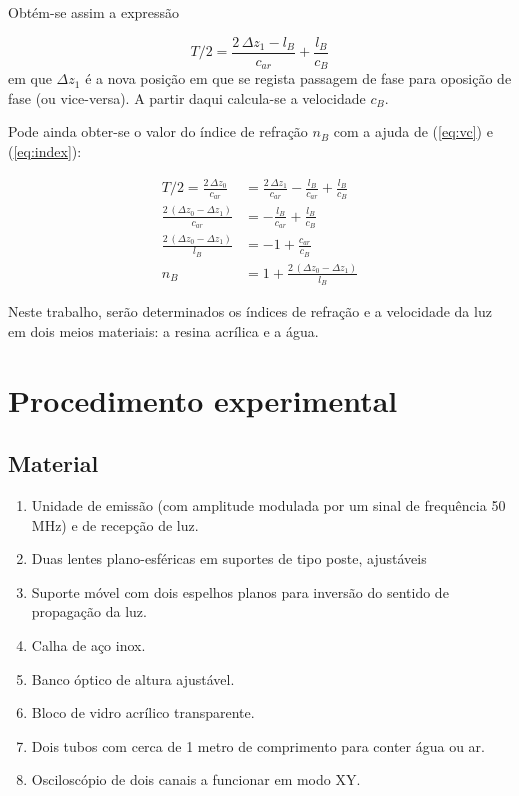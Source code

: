 \documentclass[12pt,a4paper,oneside]{paper}
\begin{document}
Obtém-se assim a expressão

\begin{equation}
	\label{eq:vc_bloco}
	{T/2}  = \frac{2\,\Delta z_1 - l_B}{c_{ar}}  +  \frac{l_B}{c_{B}}
\end{equation}
em que $\Delta z_1$ é a nova posição em que se regista passagem de fase para oposição de fase (ou vice-versa). A partir
daqui calcula-se a velocidade $c_{B}$.  

Pode ainda obter-se o valor do índice de refração $n_{B}$ com a ajuda de (\ref{eq:vc}) e (\ref{eq:index}):

\begin{align}
	\label{eq:n_bloco}
	{T/2}  = \frac{2\,\Delta z_0}{c_{ar}}  &=  \frac{2\,\Delta z_1 }{c_{ar}} -   \frac{l_B}{c_{ar}}  +  \frac{l_B}{c_{B}} \nonumber \\ 
	\frac{2\,(\Delta z_0- \Delta z_1 )}{c_{ar}}  &= -   \frac{l_B}{c_{ar}}  +  \frac{l_B}{c_{B}} \nonumber \\
	\frac{2\,(\Delta z_0- \Delta z_1 )}{l_B} &= -1 +  \frac{c_{ar}}{c_{B}} \nonumber \\
	n_{B} &= 1 +  \frac{2\,(\Delta z_0- \Delta z_1 )}{l_B} 
\end{align}

Neste trabalho, serão  determinados os índices de refração e a velocidade da luz em  dois meios materiais: a resina
acrílica e a água. 
 


\newpage
\section{\sf Procedimento experimental}
\subsection{\sf Material}

    \begin{enumerate}
    \setlength{\itemsep}{0mm}
    \item Unidade de emissão (com amplitude modulada por um sinal de frequência 50 MHz) e de recepção de luz.
    \item Duas lentes plano-esféricas em suportes de tipo poste, ajustáveis
    \item Suporte móvel com dois espelhos planos para inversão do sentido de propagação da luz.
    \item Calha de aço inox.
    \item Banco óptico de altura ajustável.  
    \item Bloco de vidro acrílico transparente.
    \item Dois tubos com cerca de 1 metro de comprimento para conter água ou ar. 
    \item Osciloscópio de dois canais a funcionar em modo XY.
    \end{enumerate}
\end{document}
